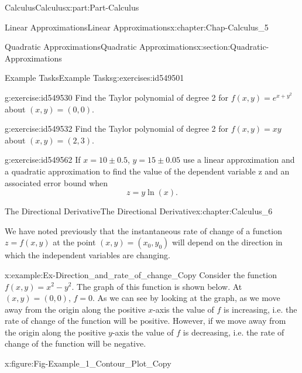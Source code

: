 \documentclass[oneside,10pt,]{book}
\numberwithin{equation}{section}
\begin{document}
\begin{partptx}{Calculus}{}{Calculus}{}{}{x:part:Part-Calculus}
\begin{chapterptx}{Linear Approximations}{}{Linear Approximations}{}{}{x:chapter:Chap-Calculus_5}
\begin{sectionptx}{Quadratic Approximations}{}{Quadratic Approximations}{}{}{x:section:Quadratic-Approximations}
\begin{exercises-subsection-numberless}{Example Tasks}{}{Example Tasks}{}{}{g:exercises:id549501}
\begin{divisionexercise}{1}{}{}{g:exercise:id549530}%
Find the Taylor polynomial of degree 2 for \(f(x,y) = e^{x+y^2}\) about \((x,y) = (0,0)\).%
\end{divisionexercise}%
\begin{divisionexercise}{2}{}{}{g:exercise:id549532}%
Find the Taylor polynomial of degree 2 for \(f(x,y)=xy\) about \((x,y)=(2,3)\).%
\end{divisionexercise}%
\begin{divisionexercise}{3}{}{}{g:exercise:id549562}%
If \(x=10 \pm 0.5\),  \(y=15 \pm 0.05\) use a linear approximation and a quadratic approximation to find the value of the dependent variable z and an associated error bound when%
\begin{equation*}
z = y\ln(x)\text{.}
\end{equation*}
%
\end{divisionexercise}%
\end{exercises-subsection-numberless}
\end{sectionptx}
\end{chapterptx}
%
\typeout{************************************************}
\typeout{************************************************}
%
\begin{chapterptx}{The Directional Derivative}{}{The Directional Derivative}{}{}{x:chapter:Calculus_6}
\begin{introduction}{}%
We have noted previously that the instantaneous rate of change of a function \(z = f(x,y)\) at the point \((x,y) = (x_0,y_0)\) will depend on the direction in which the independent variables are changing.%
\begin{example}{}{x:example:Ex-Direction_and_rate_of_change_Copy}%
Consider the function \(f(x,y) = x^2-y^2\). The graph of this function is shown below. At \((x,y)=(0,0)\), \(f=0\). As we can see by looking at the graph, as we move away from the origin along the positive \(x\)-axis the value of \(f\) is increasing, i.e. the rate of change of the function will be positive. However, if we move away from the origin along the positive \(y\)-axis the value of \(f\) is decreasing, i.e. the rate of change of the function will be negative.%
\begin{figureptx}{}{x:figure:Fig-Example_1_Contour_Plot_Copy}{}%
\begin{image}{0.15}{0.7}{0.15}%

\end{image}
\end{figureptx}
\end{example}
\end{introduction}
\end{chapterptx}
\end{partptx}
\end{document}
